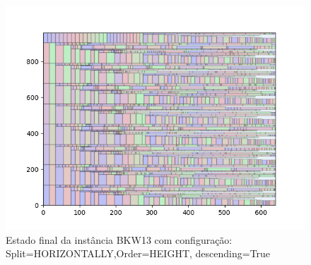 \begin{figure}[H]
    \centering
    \caption[]{Estado final da instância BKW13 com configuração: Split=HORIZONTALLY,Order=HEIGHT, descending=True}
    \label{fig:bkw13-horizontally-height-true}
    \includegraphics[scale=0.5]{output/figures/bkw/bkw13/horizontally/height/true/0000}
\end{figure}